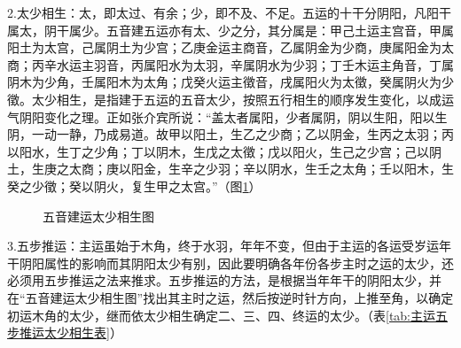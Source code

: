 \documentclass[12pt]{ctexbook}
\begin{document}
2.太少相生：太，即太过、有余；少，即不及、不足。五运的十干分阴阳，凡阳干属太，阴干属少。五音建五运亦有太、少之分，其分属是：甲己土运主宫音，甲属阳土为太宫，己属阴土为少宫；乙庚金运主商音，乙属阴金为少商，庚属阳金为太商；丙辛水运主羽音，丙属阳水为太羽，辛属阴水为少羽；丁壬木运主角音，丁属阴木为少角，壬属阳木为太角；戊癸火运主徵音，戌属阳火为太徵，癸属阴火为少徵。太少相生，是指建于五运的五音太少，按照五行相生的顺序发生变化，以成运气阴阳变化之理。正如张介宾所说：“盖太者属阳，少者属阴，阴以生阳，阳以生阴，一动一静，乃成易道。故甲以阳土，生乙之少商；乙以阴金，生丙之太羽；丙以阳水，生丁之少角；丁以阴木，生戊之太徵；戊以阳火，生己之少宫；己以阴土，生庚之太商；庚以阳金，生辛之少羽；辛以阴水，生壬之太角；壬以阳木，生癸之少徵；癸以阴火，复生甲之太宫。”（图\ref{fig:五音建运太少相生图}）


\begin{figure}[htb]%
  \centering
  \caption{五音建运太少相生图}\label{fig:五音建运太少相生图}
\end{figure}

3.五步推运：主运虽始于木角，终于水羽，年年不变，但由于主运的各运受岁运年干阴阳属性的影响而其阴阳太少有别，因此要明确各年份各步主时之运的太少，还必须用五步推运之法来推求。五步推运的方法，是根据当年年干的阴阳太少，并在“五音建运太少相生图”找出其主时之运，然后按逆时针方向，上推至角，以确定初运木角的太少，继而依太少相生确定二、三、四、终运的太少。（表\ref{tab:主运五步推运太少相生表}）
\end{document}

